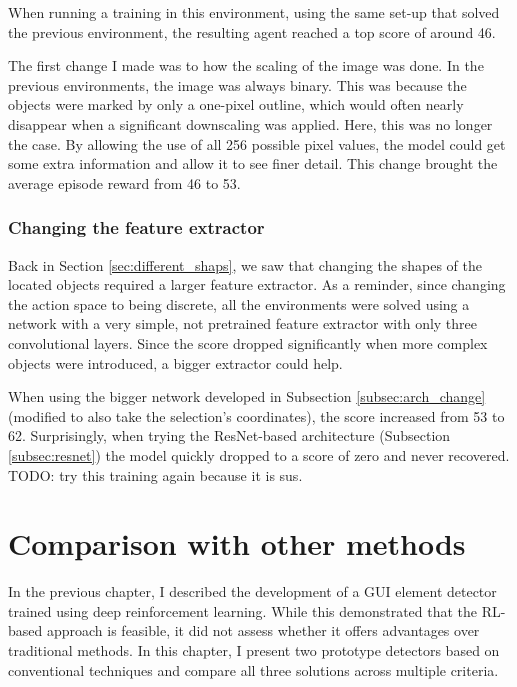 \documentclass[
  digital,     %
  oneside,     %
  nosansbold,  %
  nocolorbold, %
  lof,         %
  lot,         %
]{fithesis4}
\begin{document}
When running a training in this environment, using the same set-up that solved the previous environment, the resulting agent reached a top score of around 46.

The first change I made was to how the scaling of the image was done. In the previous environments, the image was always binary. This was because the objects were marked by only a one-pixel outline, which would often nearly disappear when a significant downscaling was applied. Here, this was no longer the case. By allowing the use of all 256 possible pixel values, the model could get some extra information and allow it to see finer detail. This change brought the average episode reward from 46 to 53.

\subsection{Changing the feature extractor}

Back in Section \ref{sec:different_shaps}, we saw that changing the shapes of the located objects required a larger feature extractor. As a reminder, since changing the action space to being discrete, all the environments were solved using a network with a very simple, not pretrained feature extractor with only three convolutional layers. Since the score dropped significantly when more complex objects were introduced, a bigger extractor could help.

When using the bigger network developed in Subsection \ref{subsec:arch_change} (modified to also take the selection's coordinates), the score increased from 53 to 62. Surprisingly, when trying the ResNet-based architecture (Subsection \ref{subsec:resnet}) the model quickly dropped to a score of zero and never recovered. TODO: try this training again because it is sus.



\chapter{Comparison with other methods}

In the previous chapter, I described the development of a GUI element detector trained using deep reinforcement learning. While this demonstrated that the RL-based approach is feasible, it did not assess whether it offers advantages over traditional methods. In this chapter, I present two prototype detectors based on conventional techniques and compare all three solutions across multiple criteria.
\end{document}
